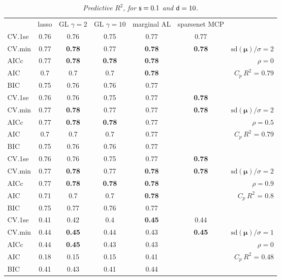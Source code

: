 \documentclass[12pt]{article}
\newcommand{\mr}[1]{\mathrm{#1}}
\newcommand{\bm}[1]{\mathbf{#1}}
\begin{document}
\begin{table}[p]\vspace{-.5cm}
\caption[l]{\label{r2}\it Predictive $R^2$, for ${\sf s}=0.1$ and  ${\sf d}=10$.}
\vspace{-.5cm}
\small{}
\begin{center}
\begin{tabular}{l*{5}{c}|r}
 & lasso & GL $\gamma=2$ & GL $\gamma=10$ & marginal AL & sparsenet MCP  &  \\
\cline{1-7}
CV.1se & 0.76 & 0.76 & 0.75 & 0.77 & 0.77 &\\
CV.min & 0.77 & {\bf 0.78} & 0.77 & {\bf 0.78} & {\bf 0.78} &  $\mr{sd}(\bm{\mu})/\sigma=2$ \\
AICc & 0.77 & {\bf 0.78} & {\bf 0.78} & {\bf 0.78} & & $\rho=0$ \\
AIC & 0.7 & 0.7 & 0.7 & {\bf 0.78} & & \multirow{2}{*}{$C_p ~ R^2$ = 0.79} \\
BIC & 0.75 & 0.76 & 0.76 & 0.77 & & \\
 \hline 
CV.1se & 0.76 & 0.76 & 0.75 & 0.77 & {\bf 0.78} &\\
CV.min & 0.77 & {\bf 0.78} & 0.77 & 0.77 & {\bf 0.78} &  $\mr{sd}(\bm{\mu})/\sigma=2$ \\
AICc & 0.77 & {\bf 0.78} & {\bf 0.78} & 0.77 & & $\rho=0.5$ \\
AIC & 0.7 & 0.7 & 0.7 & 0.77 & & \multirow{2}{*}{$C_p ~ R^2$ = 0.79} \\
BIC & 0.75 & 0.76 & 0.76 & 0.77 & & \\
 \hline 
CV.1se & 0.76 & 0.76 & 0.75 & 0.77 & {\bf 0.78} &\\
CV.min & 0.77 & {\bf 0.78} & 0.77 & {\bf 0.78} & {\bf 0.78} &  $\mr{sd}(\bm{\mu})/\sigma=2$ \\
AICc & 0.77 & {\bf 0.78} & {\bf 0.78} & {\bf 0.78} & & $\rho=0.9$ \\
AIC & 0.71 & 0.7 & 0.7 & {\bf 0.78} & & \multirow{2}{*}{$C_p ~ R^2$ = 0.8} \\
BIC & 0.75 & 0.77 & 0.76 & 0.77 & & \\
 \hline 
CV.1se & 0.41 & 0.42 & 0.4 & {\bf 0.45} & 0.44 &\\
CV.min & 0.44 & {\bf 0.45} & 0.44 & 0.43 & {\bf 0.45} &  $\mr{sd}(\bm{\mu})/\sigma=1$ \\
AICc & 0.44 & {\bf 0.45} & 0.43 & 0.43 & & $\rho=0$ \\
AIC & 0.18 & 0.15 & 0.15 & 0.41 & & \multirow{2}{*}{$C_p ~ R^2$ = 0.48} \\
BIC & 0.41 & 0.43 & 0.41 & 0.44 & & \\

\end{tabular}
\end{center}
\end{table}
\end{document}
